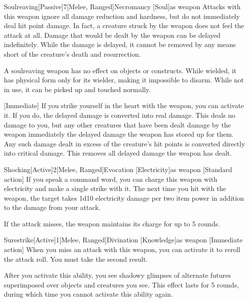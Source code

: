         \begin{magicitemdef}{Soulreaving}[Passive]{7}[Melee, Ranged]{Necromancy [Soul]}{as weapon}
             Attacks with this weapon ignore all damage reduction and hardness, but do not immediately deal hit point damage.
            In fact, a creature struck by the weapon does not feel the attack at all.
            Damage that would be dealt by the weapon can be delayed indefinitely.
            While the damage is delayed, it cannot be removed by any means short of the creature's death and resurrection.

            A soulreaving weapon has no effect on objects or constructs.
            While wielded, it has physical form only for its wielder, making it impossible to disarm.
            While not in use, it can be picked up and touched normally.

            [Immediate] If you strike yourself in the heart with the weapon, you can activate it.
            If you do, the delayed damage is converted into real damage.
            This deals no damage to you, but any other creatures that have been dealt damage by the weapon immediately the delayed damage the weapon has stored up for them.
            Any such damage dealt in excess of the creature's hit points is converted directly into critical damage.
            This removes all delayed damage the weapon has dealt.
        \end{magicitemdef}

        \begin{magicitemdef}{Shocking}[Active]{2}[Melee, Ranged]{Evocation [Electricity]}{as weapon}
            [Standard action] If you speak a command word, you can charge this weapon with electricity and make a single strike with it.
            The next time you hit with the weapon, the target takes 1d10 electricity damage per two item power in addition to the damage from your attack.

            If the attack misses, the weapon maintains its charge for up to 5 rounds.
        \end{magicitemdef}

        \begin{magicitemdef}{Surestrike}[Active]{1}[Melee, Ranged]{Divination [Knowledge]}{as weapon}
            [Immediate action] When you miss an attack with this weapon, you can activate it to reroll the attack roll.
            You must take the second result.

            After you activate this ability, you see shadowy glimpses of alternate futures superimposed over objects and creatures you see.
            This effect lasts for 5 rounds, during which time you cannot activate this ability again.
        \end{magicitemdef}

